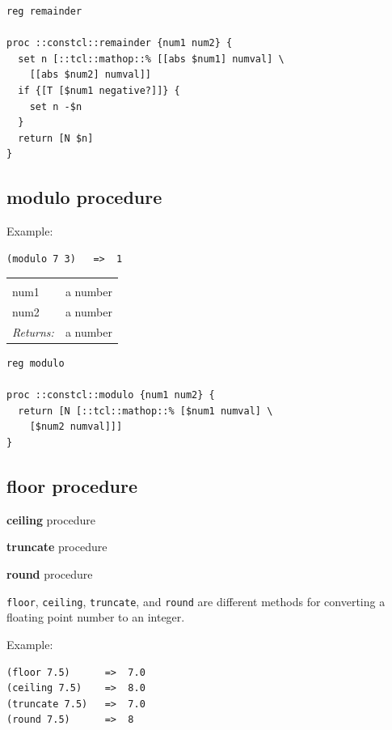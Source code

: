 \documentclass[twoside]{report}
\begin{document}
\begin{lstlisting}
reg remainder

proc ::constcl::remainder {num1 num2} {
  set n [::tcl::mathop::% [[abs $num1] numval] \
    [[abs $num2] numval]]
  if {[T [$num1 negative?]]} {
    set n -$n
  }
  return [N $n]
}
\end{lstlisting}

\subsection{modulo procedure}
\label{modulo-procedure}

Example:

\begin{verbatim}
(modulo 7 3)   =>  1
\end{verbatim}

\noindent\begin{tabular}{ |p{1.9cm} p{8cm}| }
\hline
\rowcolor[HTML]{CCCCCC} \multicolumn{2}{|l|}{\bf modulo (public)} \\
num1 & a number \\
num2 & a number \\
\textit{Returns:} & a number \\
\hline
\end{tabular}

\begin{lstlisting}
reg modulo

proc ::constcl::modulo {num1 num2} {
  return [N [::tcl::mathop::% [$num1 numval] \
    [$num2 numval]]]
}
\end{lstlisting}

\subsection{floor procedure}
\label{floor-procedure}

\noindent \textbf{ceiling} procedure

\noindent \textbf{truncate} procedure

\noindent \textbf{round} procedure

\texttt{floor}, \texttt{ceiling}, \texttt{truncate}, and \texttt{round} are different methods for converting a floating point number to an integer.

Example:

\begin{verbatim}
(floor 7.5)      =>  7.0
(ceiling 7.5)    =>  8.0
(truncate 7.5)   =>  7.0
(round 7.5)      =>  8
\end{verbatim}
\end{document}
